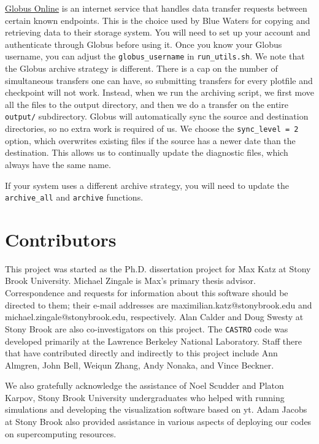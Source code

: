 \documentclass[12pt]{book}
\begin{document}
\href{https://www.globus.org/}{Globus Online} is an internet service that handles data transfer requests 
between certain known endpoints. This is the choice used by Blue Waters for copying and retrieving data
to their storage system. You will need to set up your account and authenticate through Globus before using it.
Once you know your Globus username, you can adjust the \texttt{globus\_username} in \texttt{run\_utils.sh}. 
We note that the Globus archive strategy is different. There is a cap on the number of simultaneous transfers 
one can have, so submitting transfers for every plotfile and checkpoint will not work. Instead, when we 
run the archiving script, we first move all the files to the output directory, and then we do a transfer 
on the entire \texttt{output/} subdirectory. Globus will automatically sync the source and destination 
directories, so no extra work is required of us. We choose the \texttt{sync\_level = 2} option, which 
overwrites existing files if the source has a newer date than the destination. This allows us to 
continually update the diagnostic files, which always have the same name.

If your system uses a different archive strategy, you will need to update the \texttt{archive\_all} 
and \texttt{archive} functions.

\chapter{Contributors}
\label{sec:contributors}

This project was started as the Ph.D. dissertation project for Max Katz at Stony Brook University. 
Michael Zingale is Max's primary thesis advisor. Correspondence and requests for information 
about this software should be directed to them; their e-mail addresses are maximilian.katz@stonybrook.edu
and michael.zingale@stonybrook.edu, respectively. Alan Calder and Doug Swesty at Stony Brook are 
also co-investigators on this project. The \texttt{CASTRO} code was developed primarily at the 
Lawrence Berkeley National Laboratory. Staff there that have contributed directly and 
indirectly to this project include Ann Almgren, John Bell, Weiqun Zhang, Andy Nonaka, and Vince Beckner.

We also gratefully acknowledge the assistance of Noel Scudder and Platon Karpov, 
Stony Brook University undergraduates who helped with running simulations and 
developing the visualization software based on yt. Adam Jacobs at Stony Brook also provided 
assistance in various aspects of deploying our codes on supercomputing resources.

\backmatter



\end{document}
